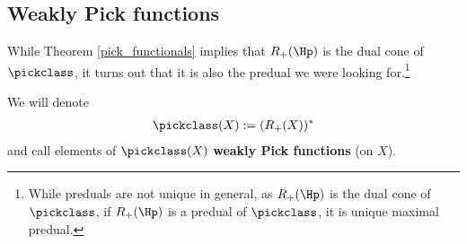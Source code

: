 \subsection{Weakly Pick functions}

While Theorem \ref{pick_functionals} implies that $R_{+}(\Hp)$ is the dual cone of $\pickclass$, it turns out that it is also the predual we were looking for.\footnote{While preduals are not unique in general, as $R_{+}(\Hp)$ is the dual cone of $\pickclass$, if $R_{+}(\Hp)$ is a predual of $\pickclass$, it is unique maximal predual.}

\begin{maar}
	We will denote
	\begin{align*}
		\pickclass(X) := (R_{+}(X))^{*}
	\end{align*}
	and call elements of $\pickclass(X)$ \textbf{weakly Pick functions} (on $X$).
\end{maar}

